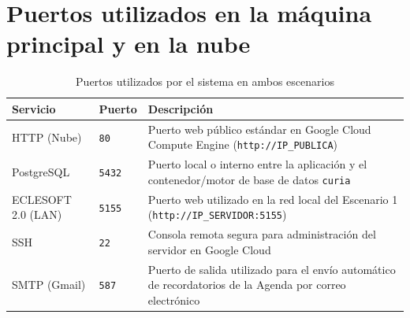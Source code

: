 \section{Puertos utilizados en la máquina principal y en la nube}
\begin{table}[h]
    \centering
    \begin{tabular}{|l|l|p{7.5cm}|}
        \hline
        \textbf{Servicio} & \textbf{Puerto} & \textbf{Descripción} \\ \hline
        HTTP (Nube) & \texttt{80} & Puerto web público estándar en Google Cloud Compute Engine (\texttt{http://IP\_PUBLICA}) \\ \hline
        PostgreSQL & \texttt{5432} & Puerto local o interno entre la aplicación y el contenedor/motor de base de datos \texttt{curia} \\ \hline
        ECLESOFT 2.0 (LAN) & \texttt{5155} & Puerto web utilizado en la red local del Escenario 1 (\texttt{http://IP\_SERVIDOR:5155}) \\ \hline
        SSH & \texttt{22} & Consola remota segura para administración del servidor en Google Cloud \\ \hline
        SMTP (Gmail) & \texttt{587} & Puerto de salida utilizado para el envío automático de recordatorios de la Agenda por correo electrónico \\ \hline
    \end{tabular}
    \caption{Puertos utilizados por el sistema en ambos escenarios}
\end{table}

